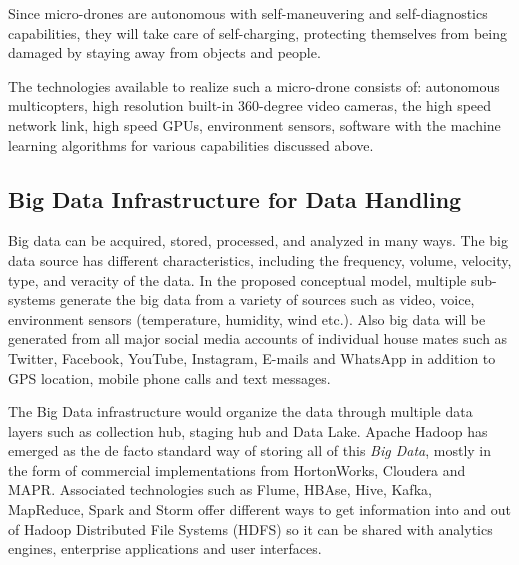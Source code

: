 \documentclass[sigconf]{acmart}
\begin{document}
Since micro-drones are autonomous with self-maneuvering and self-diagnostics capabilities, they will take care of self-charging, protecting themselves from being damaged by staying away from objects and people.

The technologies available to realize such a micro-drone consists of: autonomous multicopters, high resolution built-in 360-degree video cameras, the high speed network link, high speed GPUs, environment sensors, software with the machine learning algorithms for various capabilities discussed above.


\subsection{Big Data Infrastructure for Data Handling }
Big data can be acquired, stored, processed, and analyzed in many ways. The big data source has different characteristics, including the frequency, volume, velocity, type, and veracity of the data. In the proposed conceptual model, multiple sub-systems generate the big data from a variety of sources such as video, voice, environment sensors (temperature, humidity, wind etc.). Also big data will be generated from all major social media accounts of individual house mates such as Twitter, Facebook, YouTube, Instagram, E-mails and WhatsApp in addition to GPS location, mobile phone calls and text messages.

The Big Data infrastructure would organize the data through multiple data layers such as collection hub, staging hub and Data Lake. Apache Hadoop has emerged as the de facto standard way of storing all of this \textit{Big Data}, mostly in the form of commercial implementations from HortonWorks, Cloudera and MAPR. Associated technologies such as Flume, HBAse, Hive, Kafka, MapReduce, Spark and Storm offer different ways to get information into and out of Hadoop Distributed File Systems (HDFS) so it can be shared with analytics engines, enterprise applications and user interfaces.
\end{document}
